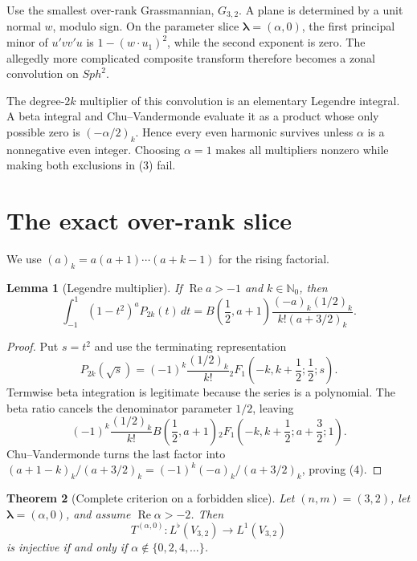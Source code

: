 \documentclass[11pt]{article}
\newtheorem{theorem}{Theorem}
\newtheorem{lemma}[theorem]{Lemma}
\newcommand{\N}{\mathbb N}
\begin{document}
Use the smallest over-rank Grassmannian, \(G_{3,2}\).  A plane is determined
by a unit normal \(w\), modulo sign.  On the parameter slice
\(\boldsymbol\lambda=(\alpha,0)\), the first principal minor of
\(u'vv'u\) is \(1-(w\cdot u_1)^2\), while the second exponent is zero.
The allegedly more complicated composite transform therefore becomes a
zonal convolution on \(Sph^2\).

The degree-\(2k\) multiplier of this convolution is an elementary Legendre
integral.  A beta integral and Chu--Vandermonde evaluate it as a product
whose only possible zero is \((-\alpha/2)_k\).  Hence every even harmonic
survives unless \(\alpha\) is a nonnegative even integer.  Choosing
\(\alpha=1\) makes all multipliers nonzero while making both exclusions in
(3) fail.

\section{The exact over-rank slice}

We use \((a)_k=a(a+1)\cdots(a+k-1)\) for the rising factorial.

\begin{lemma}[Legendre multiplier]
\label{lem:mult}
If \(\operatorname{Re}a>-1\) and \(k\in\N_0\), then
\[
 \int_{-1}^1(1-t^2)^aP_{2k}(t)\,dt
 =B\left(\frac12,a+1\right)
   \frac{(-a)_k(1/2)_k}{k!(a+3/2)_k}.                    \tag{4}
\]
\end{lemma}

\begin{proof}
Put \(s=t^2\) and use the terminating representation
\[
 P_{2k}(\sqrt{s})=(-1)^k\frac{(1/2)_k}{k!}
 {}_2F_1\left(-k,k+\frac12;\frac12;s\right).
\]
Termwise beta integration is legitimate because the series is a polynomial.
The beta ratio cancels the denominator parameter \(1/2\), leaving
\[
 (-1)^k\frac{(1/2)_k}{k!}B\left(\frac12,a+1\right)
 {}_2F_1\left(-k,k+\frac12;a+\frac32;1\right).
\]
Chu--Vandermonde turns the last factor into
\((a+1-k)_k/(a+3/2)_k=(-1)^k(-a)_k/(a+3/2)_k\), proving (4).
\end{proof}

\begin{theorem}[Complete criterion on a forbidden slice]
\label{thm:slice}
Let \((n,m)=(3,2)\), let \(\boldsymbol\lambda=(\alpha,0)\), and assume
\(\operatorname{Re}\alpha>-2\).  Then
\[
 T^{(\alpha,0)}:L^\flat(V_{3,2})\longrightarrow L^1(V_{3,2})
\]
is injective if and only if \(\alpha\notin\{0,2,4,\ldots\}\).
\end{theorem}
\end{document}
